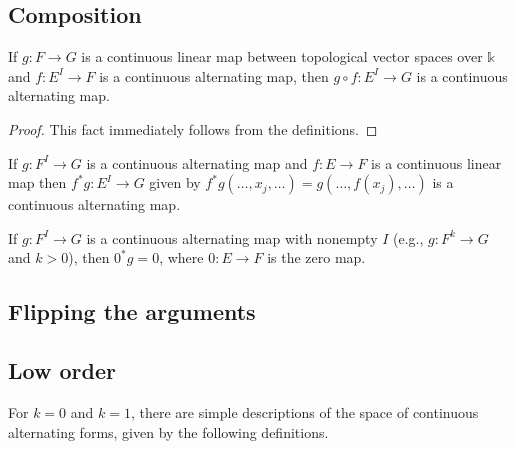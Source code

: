 
\subsection{Composition}%
\label{sec:composition}

\begin{theorem}%
  \label{thm:clm-comp}
  If \(g\colon F \to G\) is a continuous linear map between topological vector spaces over \(\mathbb k\)
  and \(f\colon E^{I} \to F\) is a continuous alternating map,
  then \(g \circ f\colon E^{I}\to G\) is a continuous alternating map.
\end{theorem}

\begin{proof}
  This fact immediately follows from the definitions.
\end{proof}

\begin{theorem}%
  \label{thm:comp-clm}
  If \(g\colon F^{I} \to G\) is a continuous alternating map
  and \(f\colon E \to F\) is a continuous linear map
  then \(f^{*}g \colon E^{I} \to G\) given by \(f^{*}g(\dots, x_{j}, \dots) = g (\dots, f(x_{j}), \dots)\) is a continuous alternating map.
\end{theorem}

\begin{lemma}%
  \label{lem:comp-clm-zero}
  If \(g\colon F^{I} \to G\) is a continuous alternating map with nonempty \(I\)
  (e.g., \(g\colon F^{k}\to G\) and \(k > 0\)),
  then \(0^{*}g = 0\), where \(0\colon E \to F\) is the zero map.
\end{lemma}

\subsection{Flipping the arguments}%
\label{sec:flipping-arguments}


\subsection{Low order}%
\label{sec:low-order}

For \(k = 0\) and \(k = 1\), there are simple descriptions of the space of continuous alternating forms,
given by the following definitions.

